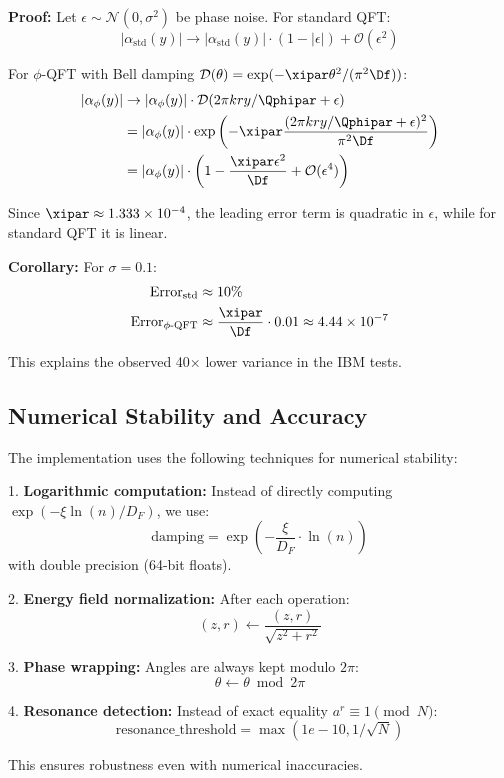 \textbf{Proof:}
Let $\epsilon \sim \mathcal{N}(0, \sigma^2)$ be phase noise. For standard QFT:
\[
|\alpha_{\text{std}}(y)| \to |\alpha_{\text{std}}(y)| \cdot (1 - |\epsilon|) + \mathcal{O}(\epsilon^2)
\]

For $\phi$-QFT with Bell damping $\mathcal{D}(\theta) = \exp(-\xipar \theta^2/(\pi^2 \Df))$:
\begin{align*}
	|\alpha_{\phi}(y)| &\to |\alpha_{\phi}(y)| \cdot \mathcal{D}(2\pi kry/\Qphipar + \epsilon) \\
	&= |\alpha_{\phi}(y)| \cdot \exp\left(-\xipar \frac{(2\pi kry/\Qphipar + \epsilon)^2}{\pi^2 \Df}\right) \\
	&= |\alpha_{\phi}(y)| \cdot \left(1 - \frac{\xipar \epsilon^2}{\Df} + \mathcal{O}(\epsilon^4)\right)
\end{align*}

Since $\xipar \approx 1.333\times 10^{-4}$, the leading error term is quadratic in $\epsilon$, while for standard QFT it is linear.

\textbf{Corollary:} For $\sigma = 0.1$:
\begin{align*}
	\text{Error}_{\text{std}} &\approx 10\% \\
	\text{Error}_{\phi\text{-QFT}} &\approx \frac{\xipar}{\Df} \cdot 0.01 \approx 4.44\times 10^{-7}
\end{align*}

This explains the observed 40× lower variance in the IBM tests.

\subsection{Numerical Stability and Accuracy}
\label{app:numerical_stability}

The implementation uses the following techniques for numerical stability:

1. \textbf{Logarithmic computation:} Instead of directly computing $\exp(-\xi \ln(n)/D_F)$, we use:
\[
\text{damping} = \exp\left(-\frac{\xi}{D_F} \cdot \ln(n)\right)
\]
with double precision (64-bit floats).

2. \textbf{Energy field normalization:} After each operation:
\[
(z, r) \leftarrow \frac{(z, r)}{\sqrt{z^2 + r^2}}
\]

3. \textbf{Phase wrapping:} Angles are always kept modulo $2\pi$:
\[
\theta \leftarrow \theta \bmod 2\pi
\]

4. \textbf{Resonance detection:} Instead of exact equality $a^r \equiv 1 \pmod{N}$:
\[
\text{resonance\_threshold} = \max(1e-10, 1/\sqrt{N})
\]

This ensures robustness even with numerical inaccuracies.